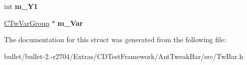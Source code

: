 \begin{DoxyCompactItemize}
\item 
\hypertarget{struct_c_tw_bar_1_1_c_custom_record_a6dc70ff3905956cc7ed7eaee620fda83}{int {\bfseries m\+\_\+\+Y1}}\label{struct_c_tw_bar_1_1_c_custom_record_a6dc70ff3905956cc7ed7eaee620fda83}

\item 
\hypertarget{struct_c_tw_bar_1_1_c_custom_record_a5b1b403a5c2cf6de7060d2c26e47ba45}{\hyperlink{struct_c_tw_var_group}{C\+Tw\+Var\+Group} $\ast$ {\bfseries m\+\_\+\+Var}}\label{struct_c_tw_bar_1_1_c_custom_record_a5b1b403a5c2cf6de7060d2c26e47ba45}

\end{DoxyCompactItemize}


The documentation for this struct was generated from the following file\+:\begin{DoxyCompactItemize}
\item 
bullet/bullet-\/2.-\/r2704/\+Extras/\+C\+D\+Test\+Framework/\+Ant\+Tweak\+Bar/src/Tw\+Bar.\+h\end{DoxyCompactItemize}
